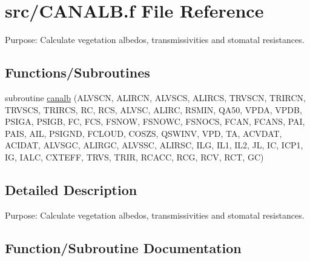 \hypertarget{CANALB_8f}{}\section{src/\+C\+A\+N\+A\+L\+B.f File Reference}
\label{CANALB_8f}


Purpose\+: Calculate vegetation albedos, transmissivities and stomatal resistances.  


\subsection*{Functions/\+Subroutines}
\begin{DoxyCompactItemize}
\item 
subroutine \hyperlink{CANALB_8f_ad01e3318e7b9408fb2f037378ffb6589}{canalb} (A\+L\+V\+S\+C\+N, A\+L\+I\+R\+C\+N, A\+L\+V\+S\+C\+S, A\+L\+I\+R\+C\+S, T\+R\+V\+S\+C\+N, T\+R\+I\+R\+C\+N, T\+R\+V\+S\+C\+S, T\+R\+I\+R\+C\+S, R\+C, R\+C\+S, A\+L\+V\+S\+C, A\+L\+I\+R\+C, R\+S\+M\+I\+N, Q\+A50, V\+P\+D\+A, V\+P\+D\+B, P\+S\+I\+G\+A, P\+S\+I\+G\+B, F\+C, F\+C\+S, F\+S\+N\+O\+W, F\+S\+N\+O\+W\+C, F\+S\+N\+O\+C\+S, F\+C\+A\+N, F\+C\+A\+N\+S, P\+A\+I, P\+A\+I\+S, A\+I\+L, P\+S\+I\+G\+N\+D, F\+C\+L\+O\+U\+D, C\+O\+S\+Z\+S, Q\+S\+W\+I\+N\+V, V\+P\+D, T\+A, A\+C\+V\+D\+A\+T, A\+C\+I\+D\+A\+T, A\+L\+V\+S\+G\+C, A\+L\+I\+R\+G\+C, A\+L\+V\+S\+S\+C, A\+L\+I\+R\+S\+C, I\+L\+G, I\+L1, I\+L2, J\+L, I\+C, I\+C\+P1, I\+G, I\+A\+L\+C, C\+X\+T\+E\+F\+F, T\+R\+V\+S, T\+R\+I\+R, R\+C\+A\+C\+C, R\+C\+G, R\+C\+V, R\+C\+T, G\+C)
\end{DoxyCompactItemize}


\subsection{Detailed Description}
Purpose\+: Calculate vegetation albedos, transmissivities and stomatal resistances. 



\subsection{Function/\+Subroutine Documentation}
\hypertarget{CANALB_8f_ad01e3318e7b9408fb2f037378ffb6589}{}
